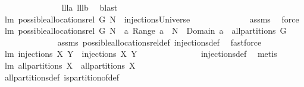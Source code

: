 \begin{isabellebody}
%
\isadelimproof
\ \ \ \ \ \ \ \ \ \ \ \ \ %
\endisadelimproof
%
\isatagproof
{}\isamarkupfalse%
\ lll{}{}a\ lll{}{}b\ \isamarkupfalse%
\ blast%
\endisatagproof
{\isafoldproof}%
%
\isadelimproof
\isanewline
%
\endisadelimproof
\isanewline
{}\isamarkupfalse%
\ lm{}{}{\isacharcolon}\ {\isachardoublequoteopen}possible{\isacharunderscore}allocations{\isacharunderscore}rel{\isacharprime}\ G\ N\ {\isasymsubseteq}\ injectionsUniverse{\isachardoublequoteclose}\isanewline
%
\isadelimproof
\ \ \ \ \ \ \ \ \ \ \ \ %
\endisadelimproof
%
\isatagproof
{}\isamarkupfalse%
\ assms\ \isamarkupfalse%
\ force%
\endisatagproof
{\isafoldproof}%
%
\isadelimproof
\isanewline
%
\endisadelimproof
\isanewline
{}\isamarkupfalse%
\ lm{}{}{\isacharcolon}\ {\isachardoublequoteopen}possible{\isacharunderscore}allocations{\isacharunderscore}rel\ G\ N\ {\isasymsubseteq}\ {\isacharbraceleft}a{\isachardot}\ {\isacharparenleft}Range\ a{\isacharparenright}\ {\isasymsubseteq}\ N\ {\isacharampersand}\ {\isacharparenleft}Domain\ a{\isacharparenright}\ {\isasymin}\ all{\isacharunderscore}partitions\ G{\isacharbraceright}{\isachardoublequoteclose}\isanewline
%
\isadelimproof
\ \ \ \ \ \ \ \ \ \ \ \ %
\endisadelimproof
%
\isatagproof
{}\isamarkupfalse%
\ assms\ possible{\isacharunderscore}allocations{\isacharunderscore}rel{\isacharunderscore}def\ injections{\isacharunderscore}def\ \isamarkupfalse%
\ fastforce%
\endisatagproof
{\isafoldproof}%
%
\isadelimproof
\isanewline
%
\endisadelimproof
\isanewline
{}\isamarkupfalse%
\ lm{}{}{\isacharcolon}\ {\isachardoublequoteopen}injections\ X\ Y\ {\isacharequal}\ injections{\isacharprime}\ X\ Y{\isachardoublequoteclose}\ \isanewline
%
\isadelimproof
\ \ \ \ \ \ \ \ \ \ \ \ %
\endisadelimproof
%
\isatagproof
{}\isamarkupfalse%
\ injections{\isacharunderscore}def\ \isamarkupfalse%
\ metis%
\endisatagproof
{\isafoldproof}%
%
\isadelimproof
\isanewline
%
\endisadelimproof
\isanewline
{}\isamarkupfalse%
\ lm{}{}{\isacharcolon}\ {\isachardoublequoteopen}all{\isacharunderscore}partitions\ X\ {\isacharequal}\ all{\isacharunderscore}partitions{\isacharprime}\ X{\isachardoublequoteclose}\ \isanewline
%
\isadelimproof
\ \ \ \ \ \ \ \ \ \ \ \ %
\endisadelimproof
%
\isatagproof
{}\isamarkupfalse%
\ all{\isacharunderscore}partitions{\isacharunderscore}def\ is{\isacharunderscore}partition{\isacharunderscore}of{\isacharunderscore}def\ \isamarkupfalse%

\end{isabellebody}

